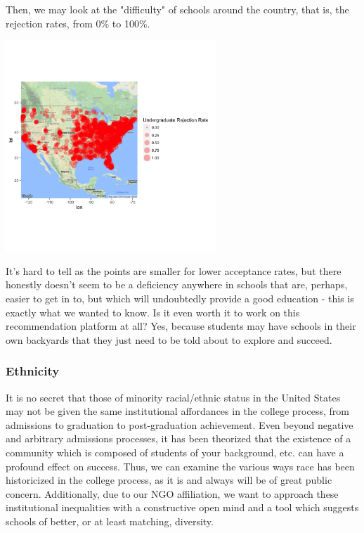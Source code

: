 \documentclass{article}\usepackage[]{graphicx}\usepackage[]{color}
\newenvironment{knitrout}{}{} %
\begin{document}
Then, we may look at the "difficulty" of schools around the country, that is, the rejection rates, from 0\% to 100\%. 

\begin{knitrout}
\color{fgcolor}

{\centering \includegraphics[width=300px]{../images/ggmap-admissionRateDistribution} 

}



\end{knitrout}

It's hard to tell as the points are smaller for lower acceptance rates, but there honestly doesn't seem to be a deficiency anywhere in schools that are, perhaps, easier to get in to, but which will undoubtedly provide a good education - this is exactly what we wanted to know. Is it even worth it to work on this recommendation platform at all? Yes, because students may have schools in their own backyards that they just need to be told about to explore and succeed. 

\subsubsection{Ethnicity}

It is no secret that those of minority racial/ethnic status in the United States may not be given the same institutional affordances in the college process, from admissions to graduation to post-graduation achievement. Even beyond negative and arbitrary admissions processes, it has been theorized that the existence of a community which is composed of students of your background, etc. can have a profound effect on success. Thus, we can examine the various ways race has been historicized in the college process, as it is and always will be of great public concern. Additionally, due to our NGO affiliation, we want to approach these institutional inequalities with a constructive open mind and a tool which suggests schools of better, or at least matching, diversity. 
\end{document}
